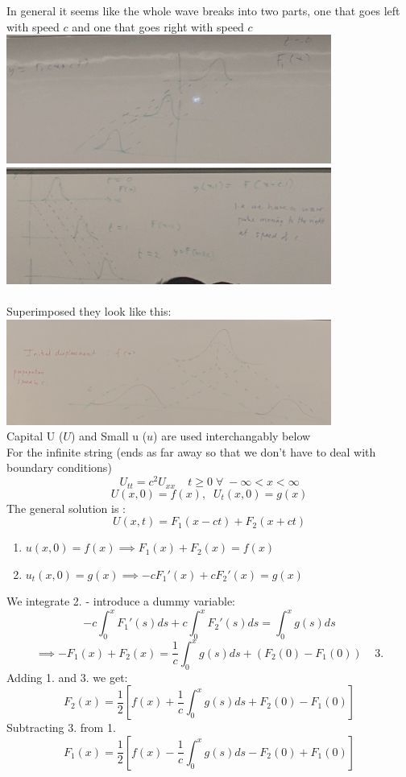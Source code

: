 \documentclass[11pt]{article}
\theoremstyle{definition}
\begin{document}
In general it seems like the whole wave breaks into two parts, one that goes left with speed $c$ and one that goes right with speed $c$\\

\includegraphics[width=0.8\textwidth]{left.jpg}\\
\includegraphics[width=0.8\textwidth]{right.jpg}\\\\

Superimposed they look like this:\\
\includegraphics[width=0.8\textwidth]{superimposed.jpg}\\
Capital U ($U$) and Small u ($u$) are used interchangably below\\
For the infinite string (ends as far away so that we don't have to deal with boundary conditions)
$$U_{tt} = c^2 U_{xx} \;\;\;\; t \geq 0 \; \forall \; -\infty < x < \infty$$
$$U(x,0) = f(x),\;\; U_t(x,0) = g(x)$$
The general solution is : 
$$U(x,t) = F_1(x-ct) + F_2(x+ct)$$
\begin{enumerate}
    \item $u(x,0) = f(x) \implies F_1(x) + F_2(x) = f(x)$
    \item $u_t(x,0) = g(x) \implies -c F_1'(x) + cF_2'(x) = g(x)$
\end{enumerate}
We integrate 2. - introduce a dummy variable:\\
$$-c\int^x_0F_1'(s)ds + c\int^x_0F_2'(s)ds = \int^x_0g(s)ds$$
$$\implies -F_1(x) + F_2(x) = \frac{1}{c}\int^x_0g(s)ds + (F_2(0) - F_1(0))\;\;\;\; 3.$$
Adding 1. and 3. we get:
$$F_2(x) = \frac{1}{2}[f(x) + \frac{1}{c}\int^x_0g(s)ds + F_2(0) - F_1(0)]$$
Subtracting 3. from 1.
$$F_1(x) = \frac{1}{2}[f(x) - \frac{1}{c}\int^x_0g(s)ds - F_2(0) + F_1(0)]$$
\end{document}
